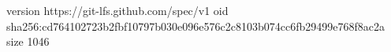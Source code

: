 version https://git-lfs.github.com/spec/v1
oid sha256:cd764102723b2fbf10797b030e096e576c2c8103b074cc6fb29499e768f8ac2a
size 1046
